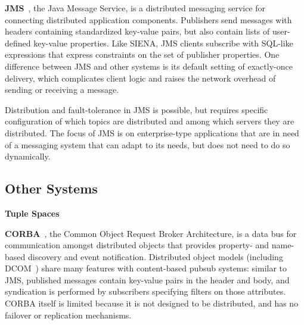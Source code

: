 \textbf{JMS}~\cite{hapner2002java}, the Java Message Service, is a distributed messaging service for connecting distributed application components.
Publishers send messages with headers containing standardized key-value pairs, but also contain lists of user-defined key-value properties.
Like SIENA, JMS clients subscribe with SQL-like expressions that express constraints on the set of publisher properties.
One difference between JMS and other systems is its default setting of exactly-once delivery, which complicates client logic and raises the network overhead of sending or receiving a message.

Distribution and fault-tolerance in JMS is possible, but requires specific configuration of which topics are distributed and among which servers they are distributed.
The focus of JMS is on enterprise-type applications that are in need of a messaging system that can adapt to its needs, but does not need to do so dynamically.


\subsection{Other Systems}

\textbf{Tuple Spaces} 

\textbf{CORBA}~\cite{vinoski1997corba}, the Common Object Request Broker Architecture, is a data bus for communication amongst distributed objects that provides property- and name-based discovery and event notification.
Distributed object models (including DCOM~\cite{horstmann1997dcom}) share many features with content-based pubsub systems: similar to JMS, published messages contain key-value pairs in the header and body, and syndication is performed by subscribers specifying filters on those attributes.
CORBA itself is limited because it is not designed to be distributed, and has no failover or replication mechanisms.

